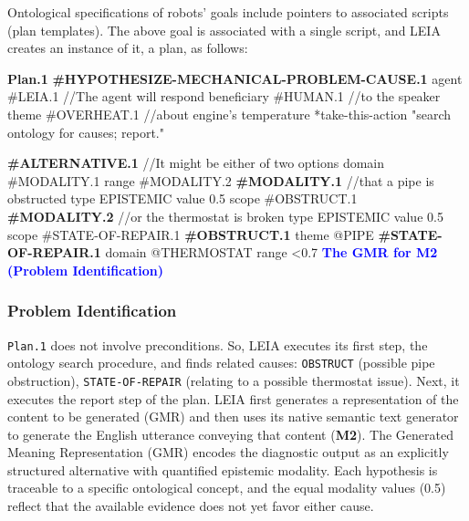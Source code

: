 \documentclass[letterpaper, 10 pt, conference]{ieeeconf}  %
\begin{document}
Ontological specifications of robots' goals include pointers to associated scripts (plan templates). The above goal is associated with a single script, and LEIA creates an instance of it, a plan, as follows:
\begin{codeblock}
\textbf{Plan.1}
 \textbf{#HYPOTHESIZE-MECHANICAL-PROBLEM-CAUSE.1}
   agent       #LEIA.1     //The agent will respond
   beneficiary #HUMAN.1    //to the speaker
   theme       #OVERHEAT.1 //about engine's temperature
   *take-this-action "search ontology for causes;
                      report."
\end{codeblock}

\begin{codeblock}
\textbf{#ALTERNATIVE.1}      //It might be either of two options
 domain #MODALITY.1
 range  #MODALITY.2
\textbf{#MODALITY.1}         //that a pipe is obstructed
 type   EPISTEMIC
 value  0.5
 scope  #OBSTRUCT.1
\textbf{#MODALITY.2}         //or the thermostat is broken
 type   EPISTEMIC
 value  0.5
 scope  #STATE-OF-REPAIR.1
\textbf{#OBSTRUCT.1}
 theme  @PIPE
\textbf{#STATE-OF-REPAIR.1}
 domain @THERMOSTAT
 range  <0.7 \hfill \textbf{\textcolor{blue}{The GMR for M2 (Problem Identification)}}
\end{codeblock}

\subsubsection{Problem Identification} \texttt{Plan.1} does not involve preconditions. So, LEIA executes its first step, the ontology search procedure, and finds related causes: \texttt{OBSTRUCT} (possible pipe obstruction), \texttt {STATE-OF-REPAIR} (relating to a possible thermostat issue). Next, it executes the report step of the plan. LEIA first generates a representation of the content to be generated (GMR) and then uses its native semantic text generator \cite{mcshane2021linguistics-995,mcshane2024agents-172} to generate the English utterance conveying that content (\textbf{M2}). The Generated Meaning Representation (GMR) encodes the diagnostic output as an explicitly structured alternative with quantified epistemic modality. Each hypothesis is traceable to a specific ontological concept, and the equal modality values (0.5) reflect that the available evidence does not yet favor either cause.



\end{document}
